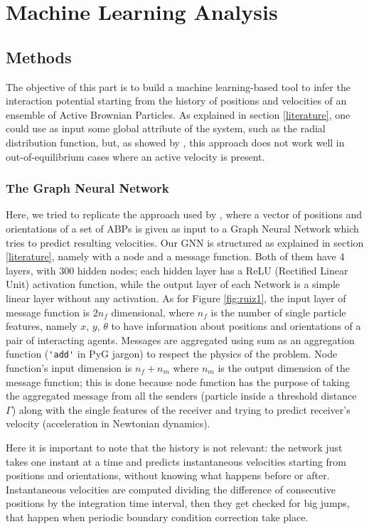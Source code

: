 \documentclass[../../master_thesis_np.tex]{subfiles}
\begin{document}
\chapter{Machine Learning Analysis}
\section{Methods}
The objective of this part is to build a machine learning-based tool to infer the interaction potential starting from the history of positions and velocities of an ensemble of Active Brownian Particles.
As explained in section \ref{literature}, one could use as input some global attribute of the system, such as the radial distribution function, but, as showed by \citeauthor{bag_interaction_2021}, this approach does not work well in out-of-equilibrium cases where an active velocity is present.

\subsection{The Graph Neural Network}
Here, we tried to replicate the approach used by \citeauthor{ruiz-garcia_discovering_2024}, where a vector of positions and orientations of a set of ABPs is given as input to a Graph Neural Network which tries to predict resulting velocities.
Our GNN is structured as explained in section \ref{literature}, namely with a node and a message function. 
Both of them have 4 layers, with 300 hidden nodes; each hidden layer has a ReLU (Rectified Linear Unit) activation function, while the output layer of each Network is a simple linear layer without any activation.
As for Figure \ref{fig:ruiz1}, the input layer of message function is $2n_f$ dimensional, where $n_f$ is the number of single particle features, namely $x$, $y$, $\theta$ to have information about positions and orientations of a pair of interacting agents.
Messages are aggregated using sum as an aggregation function (\verb|'add'| in PyG jargon) to respect the physics of the problem.
Node function's input dimension is $n_f + n_m$ where $n_m$ is the output dimension of the message function; this is done because node function has the purpose of taking the aggregated message from all the senders (particle inside a threshold distance $\Gamma$) along with the single features of the receiver and trying to predict receiver's velocity (acceleration in Newtonian dynamics).

Here it is important to note that the history is not relevant: the network just takes one instant at a time and predicts instantaneous velocities starting from positions and orientations, without knowing what happens before or after.
Instantaneous velocities are computed dividing the difference of consecutive positions by the integration time interval, then they get checked for big jumps, that happen when periodic boundary condition correction take place.
\end{document}
